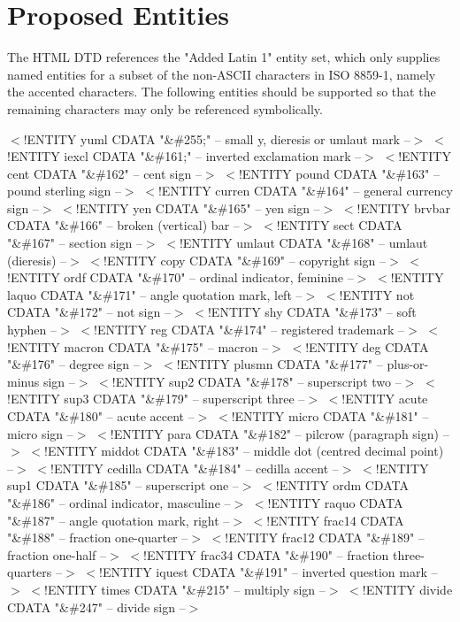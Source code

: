 \section*{Proposed Entities}\par 
The HTML DTD references the "Added Latin 1" entity set, which only
supplies named entities for a subset of the non-ASCII characters in
ISO 8859-1, namely the accented characters.  The following entities
should be supported so that the remaining characters may only be
referenced symbolically.
\par $<$!ENTITY yuml   CDATA "\&\#255;" -- small y, dieresis or umlaut mark --$>$   
$<$!ENTITY iexcl   CDATA "\&\#161;" -- inverted exclamation mark  --$>$
$<$!ENTITY cent    CDATA "\&\#162" -- cent sign  --$>$
$<$!ENTITY pound   CDATA "\&\#163" -- pound sterling sign  --$>$
$<$!ENTITY curren  CDATA "\&\#164" -- general currency sign  --$>$
$<$!ENTITY yen     CDATA "\&\#165" -- yen sign  --$>$
$<$!ENTITY brvbar  CDATA "\&\#166" -- broken (vertical) bar  --$>$
$<$!ENTITY sect    CDATA "\&\#167" -- section sign  --$>$
$<$!ENTITY umlaut  CDATA "\&\#168" -- umlaut (dieresis)  --$>$
$<$!ENTITY copy    CDATA "\&\#169" -- copyright sign  --$>$
$<$!ENTITY ordf    CDATA "\&\#170" -- ordinal indicator, feminine  --$>$
$<$!ENTITY laquo   CDATA "\&\#171" -- angle quotation mark, left  --$>$
$<$!ENTITY not     CDATA "\&\#172" -- not sign  --$>$
$<$!ENTITY shy     CDATA "\&\#173" -- soft hyphen  --$>$
$<$!ENTITY reg     CDATA "\&\#174" -- registered trademark  --$>$
$<$!ENTITY macron  CDATA "\&\#175" -- macron  --$>$
$<$!ENTITY deg     CDATA "\&\#176" -- degree sign  --$>$
$<$!ENTITY plusmn  CDATA "\&\#177" -- plus-or-minus sign  --$>$
$<$!ENTITY sup2    CDATA "\&\#178" -- superscript two  --$>$
$<$!ENTITY sup3    CDATA "\&\#179" -- superscript three  --$>$
$<$!ENTITY acute   CDATA "\&\#180" -- acute accent  --$>$
$<$!ENTITY micro   CDATA "\&\#181" -- micro sign  --$>$
$<$!ENTITY para    CDATA "\&\#182" -- pilcrow (paragraph sign)  --$>$
$<$!ENTITY middot  CDATA "\&\#183" -- middle dot (centred decimal point)  --$>$
$<$!ENTITY cedilla CDATA "\&\#184" -- cedilla accent  --$>$
$<$!ENTITY sup1    CDATA "\&\#185" -- superscript one --$>$
$<$!ENTITY ordm    CDATA "\&\#186" -- ordinal indicator, masculine --$>$
$<$!ENTITY raquo   CDATA "\&\#187" -- angle quotation mark, right --$>$
$<$!ENTITY frac14  CDATA "\&\#188" -- fraction one-quarter --$>$
$<$!ENTITY frac12  CDATA "\&\#189" -- fraction one-half --$>$
$<$!ENTITY frac34  CDATA "\&\#190" -- fraction three-quarters --$>$
$<$!ENTITY iquest  CDATA "\&\#191" -- inverted question mark --$>$
$<$!ENTITY times   CDATA "\&\#215" -- multiply sign --$>$
$<$!ENTITY divide  CDATA "\&\#247" -- divide sign --$>$

